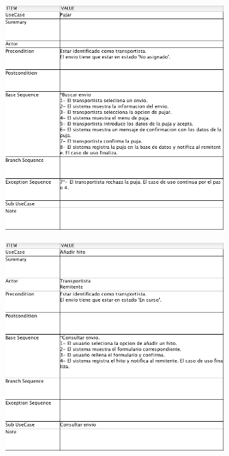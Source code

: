 \documentclass[10pt, a4paper,spanish]{article}
\begin{document}
		\begin{figure}[H]
			\centering
				\includegraphics[width=0.75\textwidth]{astah/use_case_pujar.png}
		\end{figure}

		\begin{figure}[H]
			\centering
				\includegraphics[width=0.75\textwidth]{astah/use_case_anadir_hito.png}
		\end{figure}
\end{document}
